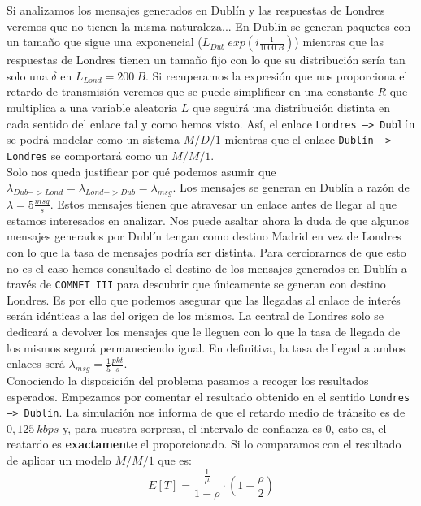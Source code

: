\documentclass{article}[12 pt]
\begin{document}
		Si analizamos los mensajes generados en Dublín y las respuestas de Londres veremos que no tienen la misma naturaleza... En Dublín se generan paquetes con un tamaño que sigue una exponencial ($L_{Dub} ~ exp(i\frac{1}{1000\ B})$) mientras que las respuestas de Londres tienen un tamaño fijo con lo que su distribución sería tan solo una $\delta$ en $L_{Lond} = 200\ B$. Si recuperamos la expresión que nos proporciona el retardo de transmisión veremos que se puede simplificar en una constante $R$ que multiplica a una variable aleatoria $L$ que seguirá una distribución distinta en cada sentido del enlace tal y como hemos visto. Así, el enlace \texttt{Londres --> Dublín} se podrá modelar como un sistema $M/D/1$ mientras que el enlace \texttt{Dublín --> Londres} se comportará como un $M/M/1$.
		\\

		Solo nos queda justificar por qué podemos asumir que $\lambda_{Dub -> Lond} = \lambda_{Lond -> Dub} = \lambda_{msg}$. Los mensajes se generan en Dublín a razón de $\lambda = 5 \frac{msg}{s}$. Estos mensajes tienen que atravesar un enlace antes de llegar al que estamos interesados en analizar. Nos puede asaltar ahora la duda de que algunos mensajes generados por Dublín tengan como destino Madrid en vez de Londres con lo que la tasa de mensajes podría ser distinta. Para cerciorarnos de que esto no es el caso hemos consultado el destino de los mensajes generados en Dublín a través de \texttt{COMNET III} para descubrir que únicamente se generan con destino Londres. Es por ello que podemos asegurar que las llegadas al enlace de interés serán idénticas a las del origen de los mismos. La central de Londres solo se dedicará a devolver los mensajes que le lleguen con lo que la tasa de llegada de los mismos segurá permaneciendo igual. En definitiva, la tasa de llegad a ambos enlaces será $\lambda_{msg} = \frac{1}{5} \frac{pkt}{s}$.
		\\

		Conociendo la disposición del problema pasamos a recoger los resultados esperados. Empezamos por comentar el resultado obtenido en el sentido \texttt{Londres --> Dublín}. La simulación nos informa de que el retardo medio de tránsito es de $0,125\ kbps$ y, para nuestra sorpresa, el intervalo de confianza es $0$, esto es, el reatardo es \textbf{exactamente} el proporcionado. Si lo comparamos con el resultado de aplicar un modelo $M/M/1$ que es:
		$$E[T] = \frac{\frac{1}{\mu}}{1 - \rho} \cdot (1 - \frac{\rho}{2})$$
\end{document}
